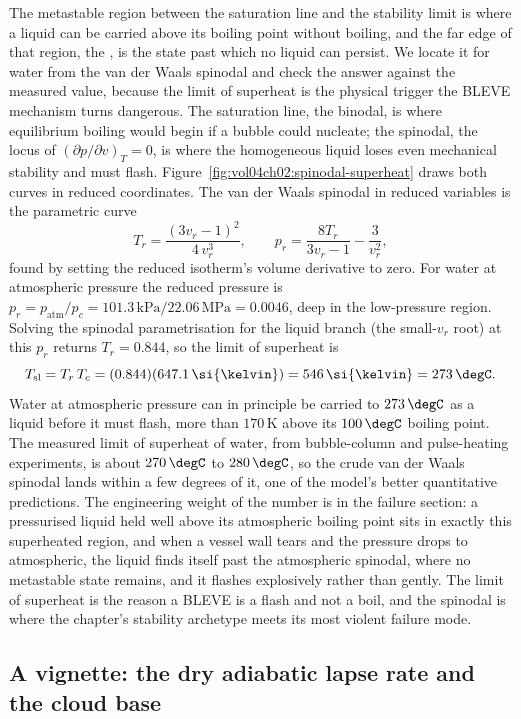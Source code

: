 The metastable region between the saturation line and the stability limit is
where a liquid can be carried above its boiling point without boiling, and
the far edge of that region, the , is the state
past which no liquid can persist. We locate it for water from the van der
Waals spinodal and check the answer against the measured value, because the
limit of superheat is the physical trigger the BLEVE mechanism turns
dangerous. The saturation line, the binodal, is where equilibrium boiling
would begin if a bubble could nucleate; the spinodal, the locus of
$(\partial p/\partial v)_T = 0$, is where the homogeneous liquid loses even
mechanical stability and must flash. Figure~\ref{fig:vol04ch02:spinodal-superheat}
draws both curves in reduced coordinates. The van der Waals spinodal in
reduced variables is the parametric curve
\[
T_r = \frac{(3v_r - 1)^2}{4\,v_r^3}, \qquad p_r = \frac{8T_r}{3v_r - 1} -
\frac{3}{v_r^2},
\]
found by setting the reduced isotherm's volume derivative to zero. For water
at atmospheric pressure the reduced pressure is $p_r = p_{\text{atm}}/p_c =
101.3\,\text{kPa}/22.06\,\text{MPa} = 0.0046$, deep in the low-pressure
region. Solving the spinodal parametrisation for the liquid branch (the
small-$v_r$ root) at this $p_r$ returns $T_r = 0.844$, so the limit of
superheat is
\[
T_{\text{sl}} = T_r\,T_c = (0.844)(647.1\,\si{\kelvin}) = 546\,\si{\kelvin}
= 273\,\degC.
\]
Water at atmospheric pressure can in principle be carried to $273\,\degC$ as
a liquid before it must flash, more than $170\,\si{\kelvin}$ above its
$100\,\degC$ boiling point. The measured limit of superheat of water, from
bubble-column and pulse-heating experiments, is about $270\,\degC$ to
$280\,\degC$, so the crude van der Waals spinodal lands within a few degrees
of it, one of the model's better quantitative predictions. The engineering
weight of the number is in the failure section: a pressurised liquid held
well above its atmospheric boiling point sits in exactly this superheated
region, and when a vessel wall tears and the pressure drops to atmospheric,
the liquid finds itself past the atmospheric spinodal, where no metastable
state remains, and it flashes explosively rather than gently. The limit of
superheat is the reason a BLEVE is a flash and not a boil, and the spinodal
is where the chapter's stability archetype meets its most violent failure
mode.



\subsection{A vignette: the dry adiabatic lapse rate and the cloud base}

